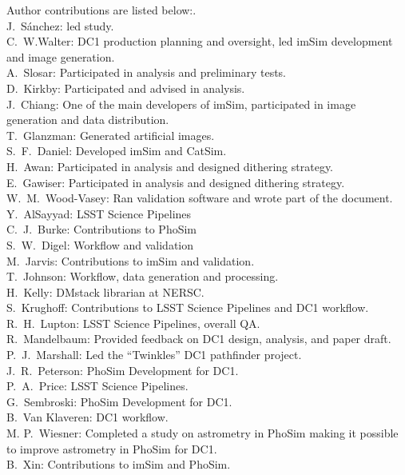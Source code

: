 Author contributions are listed below:. \\
J.~S\'{a}nchez: led study. \\
C.~W.Walter: DC1 production planning and oversight,  led imSim development and image generation. \\
A.~Slosar: Participated in analysis and preliminary tests. \\
D.~Kirkby: Participated and advised in analysis. \\
J.~Chiang: One of the main developers of imSim, participated in image generation and data distribution. \\
T.~Glanzman: Generated artificial images. \\
S.~F.~Daniel: Developed imSim and CatSim. \\
H.~Awan: Participated in analysis and designed dithering strategy. \\
E.~Gawiser: Participated in analysis and designed dithering strategy. \\
W.~M.~Wood-Vasey: Ran validation software and wrote part of the document. \\
Y.~AlSayyad: LSST Science Pipelines \\
C.~J.~Burke: Contributions to PhoSim \\
S.~W.~Digel: Workflow and validation \\
M.~Jarvis: Contributions to imSim and validation. \\
T.~Johnson: Workflow, data generation and processing. \\
H.~Kelly: DMstack librarian at NERSC. \\
S.~Krughoff: Contributions to LSST Science Pipelines and DC1 workflow. \\
R.~H.~Lupton: LSST Science Pipelines, overall QA. \\
R.~Mandelbaum: Provided feedback on DC1 design, analysis, and paper draft. \\
P.~J.~Marshall: Led the ``Twinkles'' DC1 pathfinder project. \\
J.~R.~Peterson: PhoSim Development for DC1. \\
P.~A.~Price: LSST Science Pipelines. \\
G.~Sembroski: PhoSim Development for DC1. \\
B.~Van Klaveren: DC1 workflow. \\
M. P.~Wiesner: Completed a study on astrometry in PhoSim making it possible to improve astrometry in PhoSim for DC1. \\
B.~Xin: Contributions to imSim and PhoSim. \\
